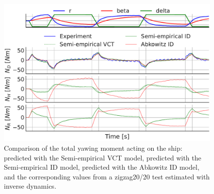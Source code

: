 \begin{figure}[ht!]
    \includegraphics[width=\columnwidth]{figures/result_ID_regression.ID_regression_ID_N.pdf}
    \caption{Comparison of the total yawing moment acting on the ship: predicted with the Semi-empirical VCT model, predicted with the Semi-empirical ID model, predicted with the Abkowitz ID model, and the corresponding values from a zigzag20/20 test estimated with inverse dynamics.}
    \label{fig:ID_regression_ID_N}
\end{figure}

